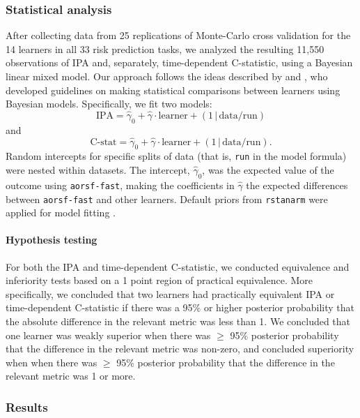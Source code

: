 \documentclass{article}\usepackage[]{graphicx}\usepackage[]{xcolor}
\newcommand{\ie}{that is}
\begin{document}
\subsubsection{Statistical analysis}

After collecting data from 25 replications of Monte-Carlo cross validation for the 14 learners in all 33 risk prediction tasks, we analyzed the resulting 11,550 observations of IPA and, separately, time-dependent C-statistic, using a Bayesian linear mixed model. Our approach follows the ideas described by \citet{benavoli2017time} and \citet{tidymodels}, who developed guidelines on making statistical comparisons between learners using Bayesian models. Specifically, we fit two models: $$\text{IPA} = \widehat{\gamma}_0 + \widehat{\gamma} \cdot \text{learner} + (1\,|\, \text{data/run}) $$ and $$\text{C-stat} = \widehat{\gamma}_0 + \widehat{\gamma} \cdot \text{learner} + (1\,|\, \text{data/run}).$$ Random intercepts for specific splits of data (\ie, \texttt{run} in the model formula) were nested within datasets. The intercept, $\widehat{\gamma}_0$, was the expected value of the outcome using \texttt{aorsf-fast}, making the coefficients in $\widehat{\gamma}$ the expected differences between \texttt{aorsf-fast} and other learners. Default priors from \texttt{rstanarm} were applied for model fitting \citep{rstanarm}.

\paragraph{Hypothesis testing} For both the IPA and time-dependent C-statistic, we conducted equivalence and inferiority tests based on a 1 point region of practical equivalence. More specifically, we concluded that two learners had practically equivalent IPA or time-dependent C-statistic if there was a 95\% or higher posterior probability that the absolute difference in the relevant metric was less than 1. We concluded that one learner was weakly superior when there was $\geq$ 95\% posterior probability that the difference in the relevant metric was non-zero, and concluded superiority when when there was $\geq$ 95\% posterior probability that the difference in the relevant metric was 1 or more.



\subsubsection{Results} \label{sec:results_pred}
\end{document}
